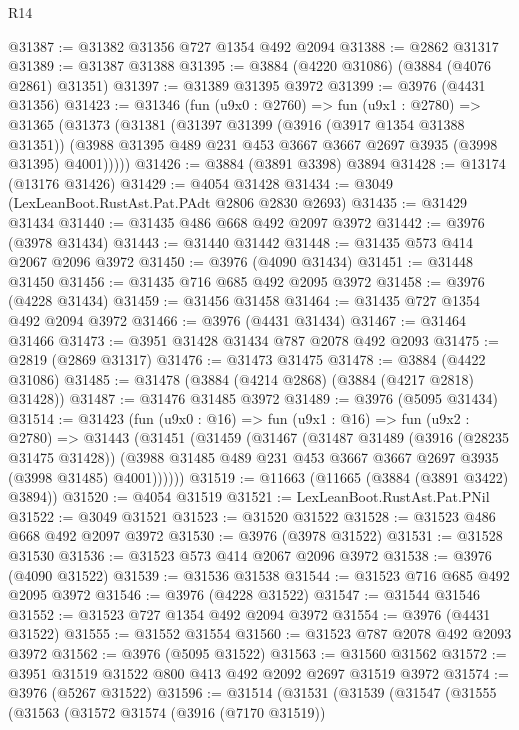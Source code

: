 \begin{lexlean}{R14}
\begin{coremodule}
@31387 := @31382 @31356 @727 @1354 @492 @2094
@31388 := @2862 @31317
@31389 := @31387 @31388
@31395 := @3884 (@4220 @31086) (@3884 (@4076 @2861) @31351)
@31397 := @31389 @31395 @3972
@31399 := @3976 (@4431 @31356)
@31423 := @31346
    (fun (u9x0 : @2760) =>
    fun (u9x1 : @2780) =>
    @31365
      (@31373
        (@31381
          (@31397
            @31399
            (@3916 (@3917 @1354 @31388 @31351))
            (@3988 @31395 @489 @231 @453 @3667 @3667 @2697 @3935 (@3998 @31395) @4001)))))
@31426 := @3884 (@3891 @3398) @3894
@31428 := @13174 (@13176 @31426)
@31429 := @4054 @31428
@31434 := @3049 (LexLeanBoot.RustAst.Pat.PAdt @2806 @2830 @2693)
@31435 := @31429 @31434
@31440 := @31435 @486 @668 @492 @2097 @3972
@31442 := @3976 (@3978 @31434)
@31443 := @31440 @31442
@31448 := @31435 @573 @414 @2067 @2096 @3972
@31450 := @3976 (@4090 @31434)
@31451 := @31448 @31450
@31456 := @31435 @716 @685 @492 @2095 @3972
@31458 := @3976 (@4228 @31434)
@31459 := @31456 @31458
@31464 := @31435 @727 @1354 @492 @2094 @3972
@31466 := @3976 (@4431 @31434)
@31467 := @31464 @31466
@31473 := @3951 @31428 @31434 @787 @2078 @492 @2093
@31475 := @2819 (@2869 @31317)
@31476 := @31473 @31475
@31478 := @3884 (@4422 @31086)
@31485 := @31478 (@3884 (@4214 @2868) (@3884 (@4217 @2818) @31428))
@31487 := @31476 @31485 @3972
@31489 := @3976 (@5095 @31434)
@31514 := @31423
    (fun (u9x0 : @16) =>
    fun (u9x1 : @16) =>
    fun (u9x2 : @2780) =>
    @31443
      (@31451
        (@31459
          (@31467
            (@31487
              @31489
              (@3916 (@28235 @31475 @31428))
              (@3988 @31485 @489 @231 @453 @3667 @3667 @2697 @3935 (@3998 @31485) @4001))))))
@31519 := @11663 (@11665 (@3884 (@3891 @3422) @3894))
@31520 := @4054 @31519
@31521 := LexLeanBoot.RustAst.Pat.PNil
@31522 := @3049 @31521
@31523 := @31520 @31522
@31528 := @31523 @486 @668 @492 @2097 @3972
@31530 := @3976 (@3978 @31522)
@31531 := @31528 @31530
@31536 := @31523 @573 @414 @2067 @2096 @3972
@31538 := @3976 (@4090 @31522)
@31539 := @31536 @31538
@31544 := @31523 @716 @685 @492 @2095 @3972
@31546 := @3976 (@4228 @31522)
@31547 := @31544 @31546
@31552 := @31523 @727 @1354 @492 @2094 @3972
@31554 := @3976 (@4431 @31522)
@31555 := @31552 @31554
@31560 := @31523 @787 @2078 @492 @2093 @3972
@31562 := @3976 (@5095 @31522)
@31563 := @31560 @31562
@31572 := @3951 @31519 @31522 @800 @413 @492 @2092 @2697 @31519 @3972
@31574 := @3976 (@5267 @31522)
@31596 := @31514
    (@31531
      (@31539
        (@31547
          (@31555
            (@31563
              (@31572
                @31574
                (@3916 (@7170 @31519))

\end{coremodule}
\end{lexlean}
